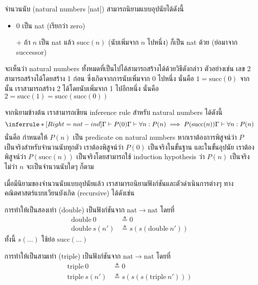 \begin{definition}
จำนวนนับ (natural numbers [nat]) สามารถนิยามแบบอุปนัยได้ดังนี้
\begin{itemize}
\item 0 เป็น nat (เรียกว่า $\mathrm{zero}$)
\item[+] ถ้า $n$ เป็น nat แล้ว $\mathrm{succ}(n)$ (นับเพิ่มจาก $n$ ไปหนึ่ง) ก็เป็น nat ด้วย (ย่อมาจาก successor)
\end{itemize}
\end{definition}
จะเห็นว่า natural numbers ทั้งหมดที่เป็นไปได้สามารถสร้างได้ด้วยวิธีดังกล่าว ตัวอย่างเช่น เลข 2 สามารถสร้างได้โดยสร้าง 1 ก่อน ซึ่งเกิดจากการนับเพิ่มจาก 0 ไปหนึ่ง นั่นคือ $1=\mathrm{succ}(0)$ \enskip จากนั้น เราสามารถสร้าง 2 ได้โดยนับเพิ่มจาก 1 ไปอีกหนึ่ง นั่นคือ $2=\mathrm{succ}(1)=\mathrm{succ}(\mathrm{succ}(0))$

จากนิยามข้างต้น เราสามารถเขียน inference rule สำหรับ natural numbers ได้ดังนี้
\[
\inferrule*[Right=nat-ind]
{\Gamma\vdash P(0) \\ \Gamma\vdash\forall n:P(n)\implies P(\mathrm{succ}(n))}
{\Gamma\vdash\forall n: P(n)}
\]
นั่นคือ กำหนดให้ $P(n)$ เป็น predicate on natural numbers \enskip หากเราต้องการพิสูจน์ว่า $P$ เป็นจริงสำหรับจำนวนนับทุกตัว เราต้องพิสูจน์ว่า $P(0)$ เป็นจริงในขั้นฐาน และในขั้นอุปนัย เราต้องพิสูจน์ว่า $P(\mathrm{succ}(n))$ เป็นจริงโดยสามารถใช้ induction hypothesis ว่า $P(n)$ เป็นจริง ไม่ว่า $n$ จะเป็นจำนวนนับใดๆ ก็ตาม

เมื่อมีนิยามของจำนวนนับแบบอุปนัยแล้ว เราสามารถนิยามฟังก์ชันและตัวดำเนินการต่างๆ ทางคณิตศาสตร์แบบเวียนบังเกิด (recursive) ได้ดังเช่น
\begin{example}
การทำให้เป็นสองเท่า ($\mathrm{double}$) เป็นฟังก์ชันจาก $\mathrm{nat}\to\mathrm{nat}$ โดยที่
\begin{align*}
\mathrm{double}\ 0 &\triangleq 0 \\
\mathrm{double}\ s(n') &\triangleq s(s(\mathrm{double}\ n'))
\end{align*}
ทั้งนี้ $s(\ldots)$ ใช้ย่อ $\mathrm{succ}(\ldots)$
\end{example}

\begin{example}
การทำให้เป็นสามเท่า ($\mathrm{triple}$) เป็นฟังก์ชันจาก $\mathrm{nat}\to\mathrm{nat}$ โดยที่
\begin{align*}
\mathrm{triple}\ 0 &\triangleq 0 \\
\mathrm{triple}\ s(n') &\triangleq s(s(s(\mathrm{triple}\ n')))
\end{align*}
\end{example}

